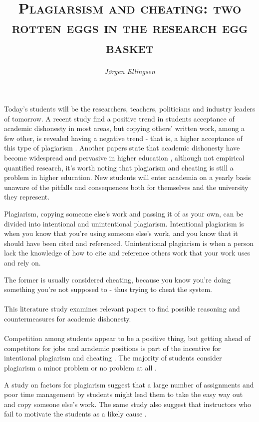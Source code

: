 \documentclass[10pt,a4paper]{article}
\author{\textit{Jørgen Ellingsen}}
\title{\textsc{Plagiarsism and cheating: two rotten eggs in the research egg basket}}
\begin{document}
\maketitle
\date{}

Today's students will be the researchers, teachers, politicians and industry leaders of tomorrow. A recent study find a positive trend in students acceptance of academic dishonesty in most areas, but copying others' written work, among a few other, is revealed having a negative trend - that is, a higher acceptance of this type of plagiarism \cite{Molnar2015}. Another papers state that academic dishonesty have become widespread and pervasive in higher education \cite{Dalal2015}, although not empirical quantified research, it's worth noting that plagiarism and cheating is still a problem in higher education. New students will enter academia on a yearly basis unaware of the pitfalls and consequences both for themselves and the university they represent. 

Plagiarism, copying someone else's work and passing it of as your own, can be divided into intentional and unintentional plagiarism. Intentional plagiarism is when you know that you're using someone else's work, and you know that it should have been cited and referenced. Unintentional plagiarism is when a person lack the knowledge of how to cite and reference others work that your work uses and rely on. 

The former is usually considered cheating, because you know you're doing something you're not supposed to - thus trying to cheat the system.
\\ \\ %
This literature study examines relevant papers to find possible reasoning and countermeasures for academic dishonesty. 
\\ \\ %
Competition among students appear to be a positive thing, but getting ahead of competitors for jobs and academic positions is part of the incentive for intentional plagiarism and cheating \cite{Teixeira2010}. The majority of students consider plagiarism a minor problem or no problem at all \cite{Teixeira2010}.

A study on factors for plagiarism suggest that a large number of assignments and poor time management by students might lead them to take the easy way out and copy someone else's work. The same study also suggest that instructors who fail to motivate the students as a likely cause \cite{Comas2010}.
\end{document}
